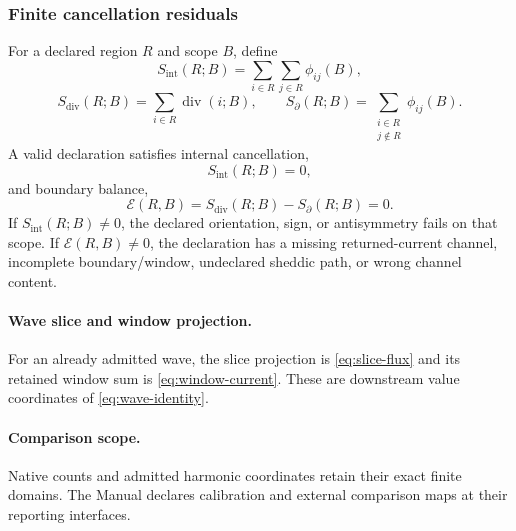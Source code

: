 \subsubsection{Finite cancellation residuals}
\label{subsec:afc-flux-stokes-audit}
For a declared region \(R\) and scope \(B\), define
\begin{equation}
S_{\mathrm{int}}(R;B)
=
\sum_{i\in R}\sum_{j\in R}\phi_{ij}(B),
\label{eq:stokes-audit-internal}
\end{equation}
\begin{equation}
S_{\mathrm{div}}(R;B)
=
\sum_{i\in R}\operatorname{div}(i;B),
\qquad
S_{\partial}(R;B)
=
\sum_{\substack{i\in R\\j\notin R}}\phi_{ij}(B).
\label{eq:stokes-audit-sums}
\end{equation}
A valid declaration satisfies internal cancellation,
\begin{equation}
S_{\mathrm{int}}(R;B)=0,
\label{eq:stokes-audit-internal-zero}
\end{equation}
and boundary balance,
\begin{equation}
\mathcal E(R,B)
=
S_{\mathrm{div}}(R;B)-S_{\partial}(R;B)=0.
\label{eq:stokes-audit-residual}
\end{equation}
If \(S_{\mathrm{int}}(R;B)\ne0\), the declared orientation, sign, or antisymmetry fails on that scope. If \(\mathcal E(R,B)\ne0\), the declaration has a missing returned-current channel, incomplete boundary/window, undeclared sheddic path, or wrong channel content.

\paragraph{Wave slice and window projection.}\label{app:wave:flux-current}
For an already admitted wave, the slice projection is \eqref{eq:slice-flux}
and its retained window sum is \eqref{eq:window-current}. These are downstream
value coordinates of \eqref{eq:wave-identity}.
\paragraph{Comparison scope.}\label{subsec:external-comparison-quarantine}
Native counts and admitted harmonic coordinates retain their exact finite
domains. The Manual declares calibration and external comparison maps at
their reporting interfaces.
